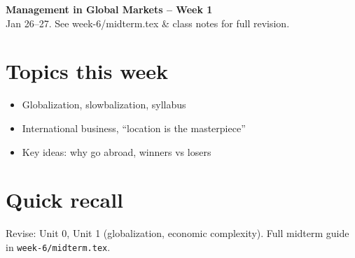\documentclass[10pt,a4paper]{article}
\begin{document}
\begin{center}
{\large\bfseries\color{eublue} Management in Global Markets -- Week 1}\\[0.2em]
\footnotesize Jan 26--27. See week-6/midterm.tex \& class notes for full revision.
\end{center}\vspace{0.5em}

\section*{\color{eublue}Topics this week}
\begin{itemize}
\item Globalization, slowbalization, syllabus
\item International business, ``location is the masterpiece''
\item Key ideas: why go abroad, winners vs losers
\end{itemize}

\section*{Quick recall}
Revise: Unit 0, Unit 1 (globalization, economic complexity). Full midterm guide in \texttt{week-6/midterm.tex}.
\end{document}
